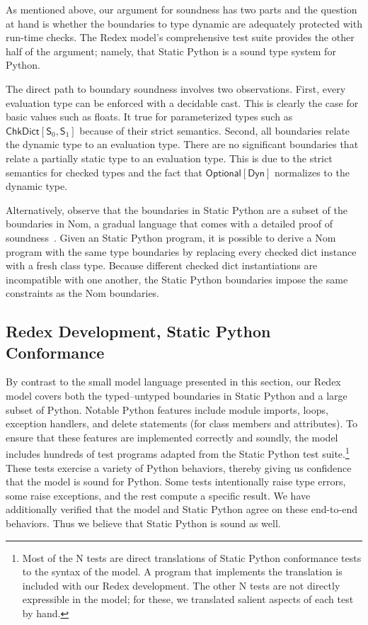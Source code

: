 \documentclass[english,cleveref,submission]{programming}
\newcommand{\SP}{Static Python}
\newcommand{\typefont}[1]{\mathsf{#1}}
\newcommand{\paramtype}[2]{#1[#2]}
\newcommand{\spteval}{\typefont{S}}
\newcommand{\sptdyn}{\typefont{Dyn}}
\newcommand{\sptoptional}[1]{\paramtype{\typefont{Optional}}{#1}}
\newcommand{\sptchkdict}[2]{\paramtype{\typefont{ChkDict}}{#1, #2}}
\begin{document}
As mentioned above, our argument for soundness has two parts
and the question at hand is whether the boundaries to type dynamic
are adequately protected with run-time checks.
The Redex model's comprehensive test suite provides the other half of the
argument; namely, that \SP{} is a sound type system for Python.

The direct path to boundary soundness involves two observations.
First, every evaluation type can be enforced with a decidable cast.
This is clearly the case for basic values such as floats.
It true for parameterized types such as $\sptchkdict{\spteval_0}{\spteval_1}$
because of their strict semantics.
Second, all boundaries relate the dynamic type to an evaluation type.
There are no significant boundaries that relate a partially static type
to an evaluation type.
This is due to the strict semantics for checked types and the fact that
$\sptoptional{\sptdyn}$ normalizes to the dynamic type.

Alternatively, observe that the boundaries in \SP{} are a subset
of the boundaries in Nom, a gradual language that comes with a detailed
proof of soundness~\cite{mt-oopsla-2017,mt-oopsla-2021}.
Given an \SP{} program, it is possible to derive a Nom program with
the same type boundaries by replacing every checked dict instance
with a fresh class type.
Because different checked dict instantiations are incompatible with
one another, the \SP{} boundaries impose the same constraints as the Nom
boundaries.


\subsection{Redex Development, \SP{} Conformance}

By contrast to the small model language presented in this section,
our Redex model covers both the typed--untyped boundaries in \SP{}
and a large subset of Python.
Notable Python features include module imports, loops, exception handlers, and
delete statements (for class members and attributes).
To ensure that these features are implemented correctly and soundly, the
model includes hundreds of test programs adapted from the \SP{} test suite.\footnote{
  Most of the N tests are direct translations of \SP{} conformance tests to
  the syntax of the model.
  A program that implements the translation is included with our Redex development.
  The other N tests are not directly expressible in the model; for these, we
  translated salient aspects of each test by hand.}
These tests exercise a variety of Python behaviors, thereby giving us confidence
that the model is sound for Python.
Some tests intentionally raise type errors, some raise exceptions, and the rest
compute a specific result.
We have additionally verified that the model and \SP{} agree on these end-to-end
behaviors.
Thus we believe that \SP{} is sound as well.
\end{document}
